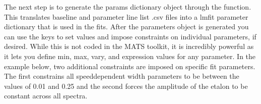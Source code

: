 \documentclass[letterpaper,10pt,english]{sphinxmanual}
\begin{document}
\begin{sphinxVerbatim}[commandchars=\\\{\}]
                        
                        
                        
\end{sphinxVerbatim}

\sphinxAtStartPar
The next step is to generate the  params dictionary object through the {\hyperref[\detokenize{MATS:MATS.fit_dataset.Fit_DataSet.generate_params}]{}} function.  This translates baseline and parameter line list .csv files into a lmfit parameter dictionary that is used in the fits.  After the parameters object is generated you can use the keys to set values and impose constraints on individual parameters, if desired.  While this is not coded in the MATS toolkit, it is incredibly powerful as it lets you define min, max, vary, and expression values for any parameter.  In the example below, two additional constraints are imposed on specific fit parameters.  The first constrains all speed\sphinxhyphen{}dependent width parameters to be between the values of 0.01 and 0.25 and the second forces the amplitude of the etalon to be constant across all spectra.
\end{document}
